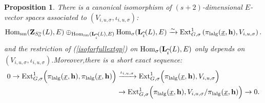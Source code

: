 \documentclass[10pt]{article}
\newtheorem{pro}[thm]{Proposition}
\newcommand{\homo}{{\rm Hom}}
\newcommand{\ext}{{\rm Ext}}
\newcommand{\sm}{{\rm sm}}
\newcommand{\lalg}{{\rm lalg}}
\newcommand{\bL}{{\mathbf{L}}}
\newcommand{\bZ}{{\mathbf{Z}}}
\newcommand{\bh}{{\mathbf{h}}}
\begin{document}
\begin{pro}\label{reinterforextgp}There is a canonical isomorphism of $(s+2)$-dimensional $E$-vector spaces associated to $(V_{i,u,\sigma},\iota_{i,u,\sigma})$:
	\begin{equation}\label{isoforfullextgp}
		\begin{aligned}
			\homo_{\sm}(\bZ_{S^u_0}(L),E)\oplus_{\homo_{\sm}(\bL_{\widehat{i}}(L),E)}\homo_{\sigma}(\bL_{\widehat{i}}(L),E)\xrightarrow{\sim}\ext^1_{G,\sigma}\left(\pi_{\lalg}(\underline{x},\bh),V_{i,u,\sigma}\right).
					\end{aligned}
	\end{equation}
and the restriction of (\ref{isoforfullextgp}) on $\homo_{\sigma}(\bL_{\widehat{i}}(L),E)$ only depends on $(V_{i,u,\sigma},\iota_{i,u,\sigma})$.\;Moreover,\;there is a short exact sequence:
\begin{equation}
	\begin{aligned}
		0\rightarrow \ext^1_{G,\sigma}\Big(\pi_{\lalg}(\underline{x},\bh),\pi_{\lalg}(\underline{x},\bh)\Big) &\xrightarrow{\iota_{i,u,\sigma}} \ext^1_{G,\sigma}\Big(\pi_{\lalg}(\underline{x},\bh),V_{i,u,\sigma}\Big) \\&\rightarrow \ext^1_{G,\sigma}\Big(\pi_{\lalg}(\underline{x},\bh),V_{i,u,\sigma}/\pi_{\lalg}(\underline{x},\bh)\Big)\rightarrow 0.
	\end{aligned}
\end{equation}
\end{pro}
\end{document}
